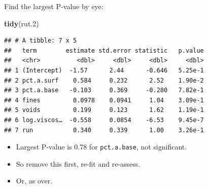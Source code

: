\documentclass[ignorenonframetext,]{beamer}
\newenvironment{Shaded}{\begin{snugshade}}{\end{snugshade}}
\newcommand{\FloatTok}[1]{\textcolor[rgb]{0.00,0.00,0.81}{#1}}
\newcommand{\KeywordTok}[1]{\textcolor[rgb]{0.13,0.29,0.53}{\textbf{#1}}}
\newcommand{\NormalTok}[1]{#1}
\providecommand{\tightlist}{%
  \setlength{\itemsep}{0pt}\setlength{\parskip}{0pt}}
\begin{document}
\begin{frame}[fragile]{Find the largest P-value by eye:}
\protect\hypertarget{find-the-largest-p-value-by-eye}{}

\begin{Shaded}
\begin{Highlighting}[]
\KeywordTok{tidy}\NormalTok{(rut}\FloatTok{.2}\NormalTok{)}
\end{Highlighting}
\end{Shaded}

\begin{verbatim}
## # A tibble: 7 x 5
##   term        estimate std.error statistic   p.value
##   <chr>          <dbl>     <dbl>     <dbl>     <dbl>
## 1 (Intercept)  -1.57      2.44      -0.646   5.25e-1
## 2 pct.a.surf    0.584     0.232      2.52    1.90e-2
## 3 pct.a.base   -0.103     0.369     -0.280   7.82e-1
## 4 fines         0.0978    0.0941     1.04    3.09e-1
## 5 voids         0.199     0.123      1.62    1.19e-1
## 6 log.viscos…  -0.558     0.0854    -6.53    9.45e-7
## 7 run           0.340     0.339      1.00    3.26e-1
\end{verbatim}

\begin{itemize}
\tightlist
\item
  Largest P-value is 0.78 for \texttt{pct.a.base}, not significant.
\item
  So remove this first, re-fit and re-assess.
\item
  Or, as over.
\end{itemize}

\end{frame}
\end{document}
